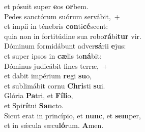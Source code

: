 \oddverse et pósuit super \textbf{e}os \textbf{or}bem.\\
\evenverse Pedes sanctórum suórum servábit,~+\\
\evenverse  et ímpii in ténebris \textbf{con}ti\textbf{cé}scent:~\*\\
\evenverse quia non in fortitúdine sua robo\textbf{rá}bi\textbf{tur} vir.\\
\oddverse Dóminum formidábunt adver\textbf{sá}rii \textbf{e}jus:~\*\\
\oddverse et super ipsos in \textbf{cæ}lis to\textbf{ná}bit:\\
\evenverse Dóminus judicábit fines terræ,~+\\
\evenverse  et dabit impérium \textbf{re}gi \textbf{su}o,~\*\\
\evenverse et sublimábit cornu \textbf{Chri}sti \textbf{su}i.\\
\oddverse Glória \textbf{Pa}tri, et \textbf{Fí}\textbf{li}o,~\*\\
\oddverse et Spi\textbf{rí}tui \textbf{San}cto.\\
\evenverse Sicut erat in princípio, et \textbf{nunc}, et \textbf{sem}per,~\*\\
\evenverse et in sǽcula sæcu\textbf{ló}rum. \textbf{A}men.\\
